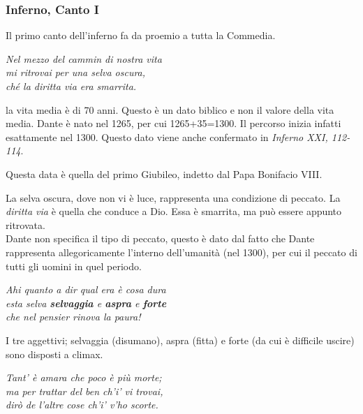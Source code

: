\documentclass[a4paper]{article}
\begin{document}
\subsubsection{Inferno, Canto I}

Il primo canto dell'inferno fa da proemio a tutta la Commedia.

\begin{center}
    \textit{Nel mezzo del cammin di nostra vita} \\
    \textit{mi ritrovai per una selva oscura,} \\
    \textit{ché la diritta via era smarrita.}
\end{center}

la vita media è di 70 anni. Questo è un dato biblico e non il valore della vita media.
Dante è nato nel 1265, per cui 1265+35=1300. Il percorso inizia infatti esattamente nel 1300.
Questo dato viene anche confermato in \textit{Inferno XXI, 112-114}.

Questa data è quella del primo Giubileo, indetto dal Papa Bonifacio VIII.

La selva oscura, dove non vi è luce, rappresenta una condizione di peccato.
La \textit{diritta via} è quella che conduce a Dio.
Essa è smarrita, ma può essere appunto ritrovata.
\\
Dante non specifica il tipo di peccato, questo è dato dal fatto che Dante rappresenta allegoricamente
l'interno dell'umanità (nel 1300), per cui il peccato di tutti gli uomini in quel periodo.

\begin{center}
    \textit{Ahi quanto a dir qual era è cosa dura} \\
    \textit{esta selva \textbf{selvaggia} e \textbf{aspra} e \textbf{forte}} \\
    \textit{che nel pensier rinova la paura!}
\end{center}

I tre aggettivi; selvaggia (disumano), aspra (fitta) e forte (da cui è difficile uscire)
sono disposti a climax.

\begin{center}
    \textit{Tant' è amara che poco è più morte;} \\
    \textit{ma per trattar del ben ch'i' vi trovai,} \\
    \textit{dirò de l'altre cose ch'i' v'ho scorte.}
\end{center}
\end{document}
